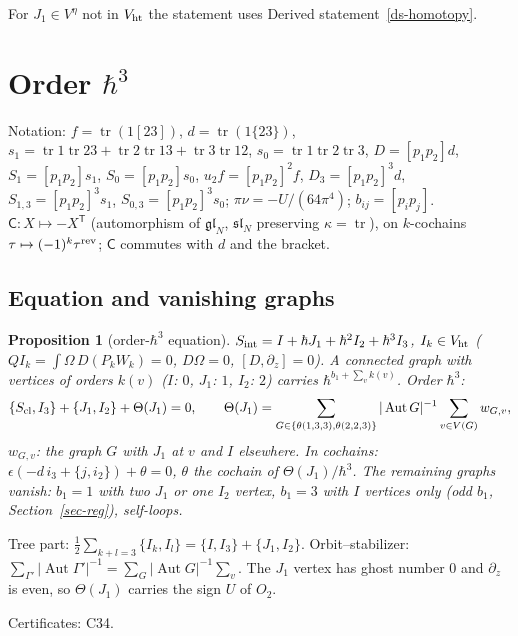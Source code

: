 \documentclass[10pt,a4paper]{article}
\numberwithin{equation}{section}
\newtheorem{proposition}[theorem]{Proposition}
\theoremstyle{definition}
\theoremstyle{remark}
\newcommand{\tr}{\operatorname{tr}}
\newcommand{\fsl}{\mathfrak{sl}}
\newcommand{\fgl}{\mathfrak{gl}}
\newcommand{\Aut}{\operatorname{Aut}}
\newcommand{\Vht}{V_{\rm ht}}
\newcommand{\Veta}{V^{\eta}}
\newcommand{\cert}[1]{\par\noindent\textup{Certificates: #1.}\par}
\newcommand{\uf}{u_2f}
\newcommand{\Dthree}{D_3}
\begin{document}
For $J_1\in\Veta$ not in $\Vht$ the statement uses Derived statement~\ref{ds-homotopy}.

\section{\texorpdfstring{Order $\hbar^3$}{Order hbar3}}\label{sec-o3}

Notation: $f=\tr(1[23])$, $d=\tr(1\{23\})$, $s_1=\tr1\tr23+\tr2\tr13+\tr3\tr12$, $s_0=\tr1\tr2\tr3$, $D=[p_1p_2]d$, $S_1=[p_1p_2]s_1$, $S_0=[p_1p_2]s_0$, $\uf=[p_1p_2]^2f$, $\Dthree=[p_1p_2]^3d$, $S_{1,3}=[p_1p_2]^3s_1$, $S_{0,3}=[p_1p_2]^3s_0$; $\pi\nu=-U/(64\pi^4)$; $b_{ij}=[p_ip_j]$. $\mathsf C:X\mapsto-X^{\mathsf T}$ (automorphism of $\fgl_N$, $\fsl_N$ preserving $\kappa=\tr$), on $k$-cochains $\tau\mapsto(-1)^k\tau^{\rm rev}$; $\mathsf C$ commutes with $d$ and the bracket.

\subsection{Equation and vanishing graphs}

\begin{proposition}[order-$\hbar^3$ equation]\label{prop-o3eq}
$S_{\rm int}=I+\hbar J_1+\hbar^2I_2+\hbar^3I_3$, $I_k\in\Vht$ ($QI_k=\int\Omega\,D(P_kW_k)=0$, $D\Omega=0$, $[D,\partial_z]=0$). A connected graph with vertices of orders $k(v)$ ($I$: $0$, $J_1$: $1$, $I_2$: $2$) carries $\hbar^{b_1+\sum_vk(v)}$. Order $\hbar^3$:
\begin{equation}
\{S_{\rm cl},I_3\}+\{J_1,I_2\}+\Theta(J_1)=0,\qquad \Theta(J_1)=\sum_{G\in\{\theta(1,3,3),\theta(2,2,3)\}}|\Aut G|^{-1}\sum_{v\in V(G)}w_{G,v},\label{eq-o3}
\end{equation}
$w_{G,v}$: the graph $G$ with $J_1$ at $v$ and $I$ elsewhere. In cochains: $\epsilon(-d\,i_3+\{j,i_2\})+\theta=0$, $\theta$ the cochain of $\Theta(J_1)/\hbar^3$. The remaining graphs vanish: $b_1=1$ with two $J_1$ or one $I_2$ vertex, $b_1=3$ with $I$ vertices only (odd $b_1$, Section~\ref{sec-reg}), self-loops.
\end{proposition}
Tree part: $\frac12\sum_{k+l=3}\{I_k,I_l\}=\{I,I_3\}+\{J_1,I_2\}$. Orbit--stabilizer: $\sum_{\Gamma'}|\Aut\Gamma'|^{-1}=\sum_G|\Aut G|^{-1}\sum_v$. The $J_1$ vertex has ghost number $0$ and $\partial_z$ is even, so $\Theta(J_1)$ carries the sign $U$ of $O_2$.
\cert{C34}
\end{document}
